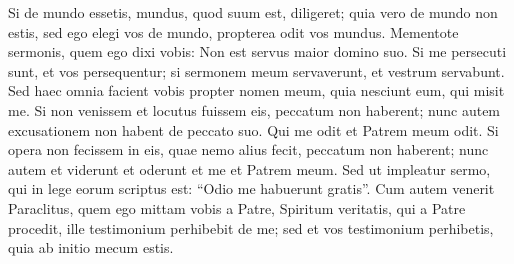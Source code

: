 \begin{biblechapter}
\begin{biblechapter}
\begin{biblechapter}
\begin{biblechapter}
\begin{biblechapter}
\begin{biblechapter}
\begin{biblechapter}
\begin{biblechapter}
\begin{biblechapter}
\begin{biblechapter}
\begin{biblechapter}
\begin{biblechapter}
\begin{biblechapter}
\begin{biblechapter}
\begin{biblechapter}
\verse Si de mundo essetis, mundus, quod suum est, diligeret; quia vero de mundo non estis, sed ego elegi vos de mundo, propterea odit vos mundus. 
\verse Mementote sermonis, quem ego dixi vobis: Non est servus maior domino suo. Si me persecuti sunt, et vos persequentur; si sermonem meum servaverunt, et vestrum servabunt. 
 \verse Sed haec omnia facient vobis propter nomen meum, quia nesciunt eum, qui misit me. 
\verse Si non venissem et locutus fuissem eis, peccatum non haberent; nunc autem excusationem non habent de peccato suo. 
\verse Qui me odit et Patrem meum odit. 
\verse Si opera non fecissem in eis, quae nemo alius fecit, peccatum non haberent; nunc autem et viderunt et oderunt et me et Patrem meum. 
\verse Sed ut impleatur sermo, qui in lege eorum scriptus est: “Odio me habuerunt gratis”.
 \verse Cum autem venerit Paraclitus, quem ego mittam vobis a Patre, Spiritum veritatis, qui a Patre procedit, ille testimonium perhibebit de me; 
\verse sed et vos testimonium perhibetis, quia ab initio mecum estis.
 

\end{biblechapter}
\end{biblechapter}
\end{biblechapter}
\end{biblechapter}
\end{biblechapter}
\end{biblechapter}
\end{biblechapter}
\end{biblechapter}
\end{biblechapter}
\end{biblechapter}
\end{biblechapter}
\end{biblechapter}
\end{biblechapter}
\end{biblechapter}
\end{biblechapter}
